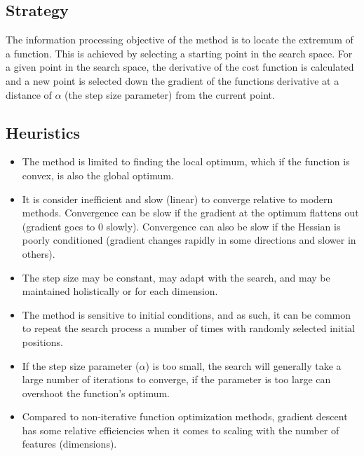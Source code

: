 \subsection{Strategy}
The information processing objective of the method is to locate the extremum of a function.
This is achieved by selecting a starting point in the search space. For a given point in the search space, the derivative of the cost function is calculated and a new point is selected down the gradient of the functions derivative at a distance of $\alpha$ (the step size parameter) from the current point. 

\subsection{Heuristics}

\begin{itemize}
	\item The method is limited to finding the local optimum, which if the function is convex, is also the global optimum.
	\item It is consider inefficient and slow (linear) to converge relative to modern methods. Convergence can be slow if the gradient at the optimum flattens out (gradient goes to 0 slowly). Convergence can also be slow if the Hessian is poorly conditioned (gradient changes rapidly in some directions and slower in others).
	\item The step size may be constant, may adapt with the search, and may be maintained holistically or for each dimension.
	\item The method is sensitive to initial conditions, and as such, it can be common to repeat the search process a number of times with randomly selected initial positions.
	\item If the step size parameter ($\alpha$) is too small, the search will generally take a large number of iterations to converge, if the parameter is too large can overshoot the function's optimum.
	\item Compared to non-iterative function optimization methods, gradient descent has some relative efficiencies when it comes to scaling with the number of features (dimensions).
\end{itemize}

